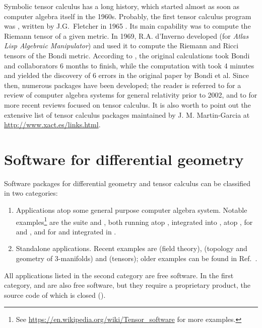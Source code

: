 Symbolic tensor calculus has a long history, which started
almost as soon as computer algebra itself in the 1960s.
Probably, the first tensor calculus program was , written by J.G.~Fletcher
in 1965 \cite{Fletc67}. Its main capability was to compute the Riemann tensor
of a given metric. In 1969, R.A. d'Inverno developed 
(for \emph{Atlas Lisp Algebraic Manipulator}) and used it to compute
the Riemann and Ricci tensors of the Bondi metric.
According to \cite{Skea94},
the original calculations took Bondi and collaborators 6 months to finish,
while the computation with  took 4 minutes and yielded the
discovery of 6 errors in the original paper by Bondi et al.
Since then, numerous packages have been developed; the reader is referred to \cite{MacCa02}
for a review of computer algebra
systems for general relativity prior to 2002, and to \cite{KorolKS13,BirkaGSC17} for  more recent reviews
focused on tensor calculus.
It is also worth to point out the extensive list of
tensor calculus packages maintained by J. M. Martin-Garcia at
\url{http://www.xact.es/links.html}.


\section{Software for differential geometry}

Software packages for differential geometry and tensor calculus can be
classified in two categories:
\begin{enumerate}
\item Applications atop some general purpose computer algebra system.
Notable examples\footnote{See \url{https://en.wikipedia.org/wiki/Tensor_software}
for more examples.} are
the  suite \cite{Marti08} and  \cite{ricci}, both
running atop ,
 \cite{AnderT12} integrated into ,
 \cite{grtensorIII} atop ,  \cite{atlas2}
for  and ,  and  for 
\cite{Toth05}
and
 \cite{sagemanifolds} integrated in .
\item Standalone applications. Recent examples are 
\cite{Peete07} (field theory),
 \cite{snappy} (topology and geometry of 3-manifolds)  and
 \cite{BolotP13} (tensors); older examples can be found in
Ref.~\cite{MacCa02}.
\end{enumerate}
All applications listed in the second category are free software. In
the first category,  and  are also free software, but
they require a proprietary product, the source code of which is closed ().

